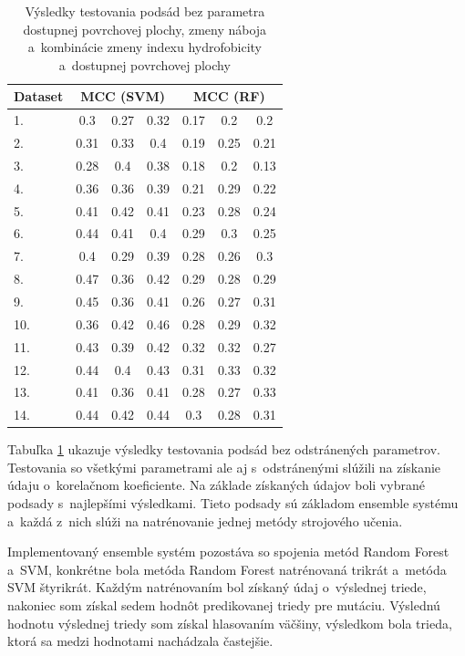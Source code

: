 \begin{table}[H]
	\centering
	\begin{tabular}{|l |c |c |c |c |c |c|}
	\hline
	Dataset & \multicolumn{3}{c|}{MCC (SVM)} & \multicolumn{3}{c|}{MCC (RF)} \\ \cline{1-7}
	\hline 
	1. & 0.3 & 0.27 & 0.32 & 0.17 & 0.2 & 0.2 \\ \cline{1-7} 
	2. & 0.31 & 0.33 & 0.4 & 0.19 & 0.25 & 0.21\\ \cline{1-7} 
	3. & 0.28 & 0.4 & 0.38 & 0.18 & 0.2 & 0.13 \\ \cline{1-7}
	4. & 0.36 & 0.36 & 0.39 & 0.21 & 0.29 & 0.22 \\ \cline{1-7}
	5. & 0.41 & 0.42 & 0.41 & 0.23 & 0.28 & 0.24\\ \cline{1-7}
	6. & 0.44 & 0.41 & 0.4 & 0.29 & 0.3 & 0.25\\ \cline{1-7}
	7. & 0.4 & 0.29 & 0.39 & 0.28 & 0.26 & 0.3\\ \cline{1-7}
	8. & 0.47 & 0.36 & 0.42 & 0.29 & 0.28 & 0.29\\ \cline{1-7}
	9. & 0.45 & 0.36 & 0.41 & 0.26 & 0.27 & 0.31\\ \cline{1-7}
	10.& 0.36 & 0.42 & 0.46 & 0.28 & 0.29 & 0.32\\ \cline{1-7}
	11.& 0.43 & 0.39 & 0.42 & 0.32 & 0.32 & 0.27\\ \cline{1-7}
	12.& 0.44 & 0.4 & 0.43  & 0.31 & 0.33 & 0.32\\ \cline{1-7}
	13.& 0.41 & 0.36  & 0.41 & 0.28 & 0.27 & 0.33\\ \cline{1-7}
	14.& 0.44 & 0.42 & 0.44 & 0.3 & 0.28 &  0.31\\ \cline{1-7}
	\hline
	\end{tabular}
\caption {Výsledky testovania podsád bez parametra dostupnej povrchovej plochy, zmeny náboja a~kombinácie zmeny indexu hydrofobicity a~dostupnej povrchovej plochy} 
\label{pythontest1} 
\end{table}


Tabuľka \ref{pythontest1} ukazuje výsledky testovania podsád bez odstránených parametrov. Testovania so všetkými parametrami ale aj s~odstránenými slúžili na získanie údaju o~korelačnom koeficiente. Na základe získaných údajov boli vybrané podsady s~najlepšími výsledkami. Tieto podsady sú základom ensemble systému a~každá z~nich slúži na natrénovanie jednej metódy strojového učenia.

Implementovaný ensemble systém pozostáva so spojenia metód Random Forest a~SVM, konkrétne bola metóda Random Forest natrénovaná trikrát a~metóda SVM štyrikrát. Každým natrénovaním bol získaný údaj o~výslednej triede, nakoniec som získal sedem hodnôt predikovanej triedy pre mutáciu. Výslednú hodnotu výslednej triedy som získal hlasovaním väčšiny, výsledkom bola trieda, ktorá sa medzi hodnotami nachádzala častejšie.

